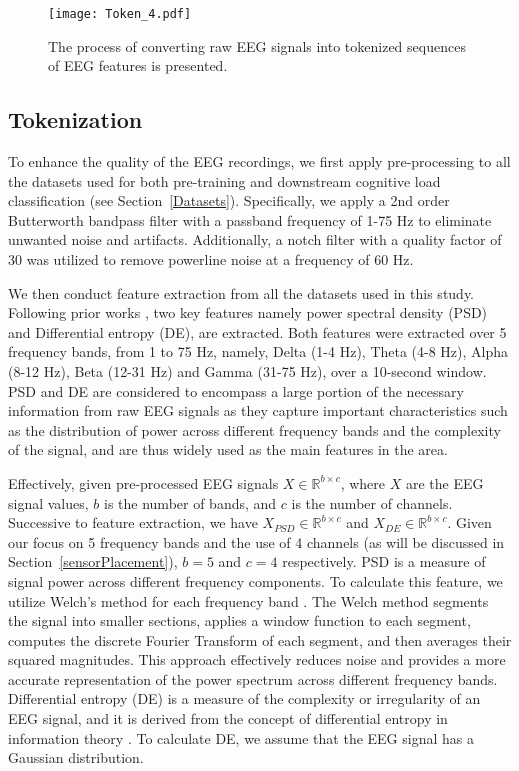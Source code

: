 \documentclass[sigconf]{acmart}
\begin{document}
\begin{figure}[t]
\centering
\texttt{[image: Token\_4.pdf]}
\caption{The process of converting raw EEG signals into tokenized sequences of EEG features is presented.}
\label{figToken}
\end{figure}


\subsection{Tokenization}

To enhance the quality of the EEG recordings, we first apply pre-processing to all the datasets used for both pre-training and downstream cognitive load classification (see Section~\ref{Datasets}). Specifically, we apply a 2nd order Butterworth bandpass filter with a passband frequency of 1-75 Hz to eliminate unwanted noise and artifacts. Additionally, a notch filter with a quality factor of 30 was utilized to remove powerline noise at a frequency of 60 Hz.

We then conduct feature extraction from all the datasets used in this study. Following prior works \cite{zhang2020spatio,zhang2022parse,angkan2023multimodal,wu2019identifying}, two key features namely power spectral density (PSD) and Differential entropy (DE), are extracted. Both features were extracted over 5 frequency bands, from 1 to 75 Hz, namely, Delta (1-4 Hz), Theta (4-8 Hz), Alpha (8-12 Hz), Beta (12-31 Hz) and Gamma (31-75 Hz), over a 10-second window. PSD and DE are considered to encompass a large portion of the necessary information from raw EEG signals as they capture important characteristics such as the distribution of power across different frequency bands and the complexity of the signal, and are thus widely used as the main features in the area. 

Effectively, given pre-processed EEG signals $X \in \mathbb{R}^{b \times c}$, where $X$ are the EEG signal values, $b$ is the number of bands, and $c$ is the number of channels. Successive to feature extraction, we have $X_{PSD} \in \mathbb{R}^{b \times c}$ and $X_{DE} \in \mathbb{R}^{b \times c}$. Given our focus on 5 frequency bands and the use of 4 channels (as will be discussed in Section~\ref{sensorPlacement}), $b = 5$ and $c = 4$ respectively. PSD is a measure of signal power across different frequency components. To calculate this feature, we utilize Welch's method for each frequency band \cite{solomon1991psd}. The Welch method segments the signal into smaller sections, applies a window function to each segment, computes the discrete Fourier Transform of each segment, and then averages their squared magnitudes. This approach effectively reduces noise and provides a more accurate representation of the power spectrum across different frequency bands. Differential entropy (DE) is a measure of the complexity or irregularity of an EEG signal, and it is derived from the concept of differential entropy in information theory \cite{duan2013differential}. To calculate DE, we assume that the EEG signal has a Gaussian distribution.
\end{document}
